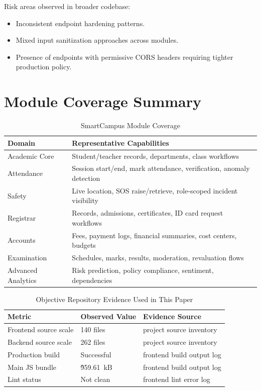 \documentclass[conference]{IEEEtran}
\begin{document}
Risk areas observed in broader codebase:
\begin{itemize}
    \item Inconsistent endpoint hardening patterns.
    \item Mixed input sanitization approaches across modules.
    \item Presence of endpoints with permissive CORS headers requiring tighter production policy.
\end{itemize}

\section{Module Coverage Summary}
\begin{table}[htbp]
\caption{SmartCampus Module Coverage}
\label{tab:modules}
\centering
\begin{tabular}{p{3.1cm}p{4.7cm}}
\toprule
\textbf{Domain} & \textbf{Representative Capabilities} \\
\midrule
Academic Core & Student/teacher records, departments, class workflows \\
Attendance & Session start/end, mark attendance, verification, anomaly detection \\
Safety & Live location, SOS raise/retrieve, role-scoped incident visibility \\
Registrar & Records, admissions, certificates, ID card request workflows \\
Accounts & Fees, payment logs, financial summaries, cost centers, budgets \\
Examination & Schedules, marks, results, moderation, revaluation flows \\
Advanced Analytics & Risk prediction, policy compliance, sentiment, dependencies \\
\bottomrule
\end{tabular}
\end{table}

\begin{table}[htbp]
\caption{Objective Repository Evidence Used in This Paper}
\label{tab:evidence}
\centering
\begin{tabular}{p{2.4cm}p{2.2cm}p{2.8cm}}
\toprule
\textbf{Metric} & \textbf{Observed Value} & \textbf{Evidence Source} \\
\midrule
Frontend source scale & 140 files & project source inventory \\
Backend source scale & 262 files & project source inventory \\
Production build & Successful & frontend build output log \\
Main JS bundle & \~959.61~kB & frontend build output log \\
Lint status & Not clean & frontend lint error log \\
\bottomrule
\end{tabular}
\end{table}
\end{document}
